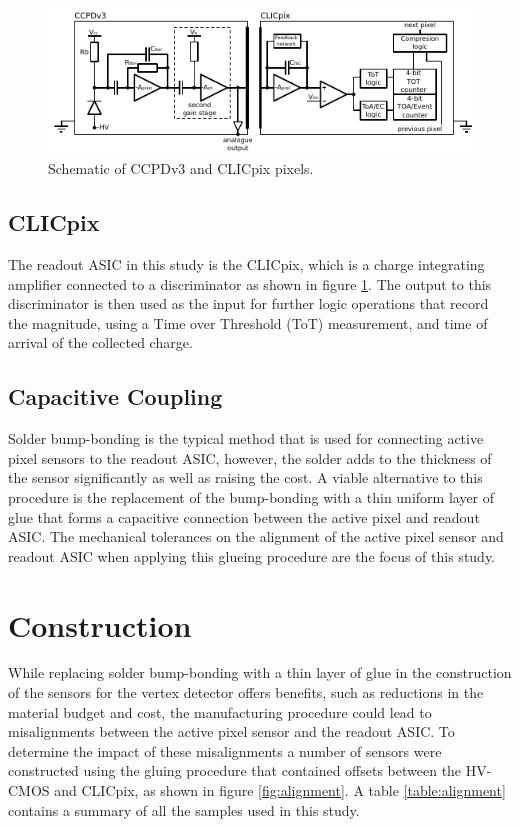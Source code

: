 \begin{figure}
\centering
\includegraphics[width=1.0\textwidth]{CLICdpVertex/Plots/schematic.pdf}
\caption[Schematic of CCPDv3 and CLICpix pixels.]{Schematic of CCPDv3 and CLICpix pixels.}
\label{fig:ccpdandclicpix}
\end{figure}

\subsection{CLICpix}
The readout ASIC in this study is the CLICpix, which is a charge integrating amplifier connected to a discriminator as shown in figure \ref{fig:ccpdandclicpix}.  The output to this discriminator is then used as the input for further logic operations that record the magnitude, using a Time over Threshold (ToT) measurement, and time of arrival of the collected charge.

\subsection{Capacitive Coupling}
Solder bump-bonding is the typical method that is used for connecting active pixel sensors to the readout ASIC, however, the solder adds to the thickness of the sensor significantly as well as raising the cost.  A viable alternative to this procedure is the replacement of the bump-bonding with a thin uniform layer of glue that forms a capacitive connection between the active pixel and readout ASIC.  The mechanical tolerances on the alignment of the active pixel sensor and readout ASIC when applying this glueing procedure are the focus of this study.  

\section{Construction}
While replacing solder bump-bonding with a thin layer of glue in the construction of the sensors for the vertex detector offers benefits, such as reductions in the material budget and cost, the manufacturing procedure could lead to misalignments between the active pixel sensor and the readout ASIC.  To determine the impact of these misalignments a number of sensors were constructed using the gluing procedure that contained offsets between the HV-CMOS and CLICpix, as shown in figure \ref{fig:alignment}.  A table \ref{table:alignment} contains a summary of all the samples used in this study.

